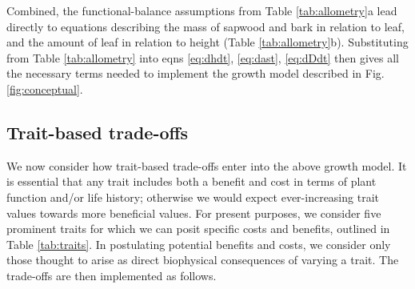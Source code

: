 \documentclass[a4paper,11pt]{article}
\begin{document}
Combined, the functional-balance assumptions from Table \ref{tab:allometry}a lead directly to equations describing the mass of sapwood and bark in relation to leaf, and the amount of leaf in relation to height (Table \ref{tab:allometry}b). Substituting from Table \ref{tab:allometry} into eqns \ref{eq:dhdt}, \ref{eq:dast}, \ref{eq:dDdt} then gives all the necessary terms needed to implement the growth model described in Fig. \ref{fig:conceptual}.

\subsection{Trait-based trade-offs}

We now consider how trait-based trade-offs enter into the above growth model. It is essential that any trait includes both a benefit and cost in terms of plant function and/or life history; otherwise we would expect ever-increasing trait values towards more beneficial values. For present purposes, we consider five prominent traits for which we can posit specific costs and benefits, outlined in Table \ref{tab:traits}. In postulating potential benefits and costs, we consider only those thought to arise as direct biophysical consequences of varying a trait. The trade-offs are then implemented as follows.
\end{document}
